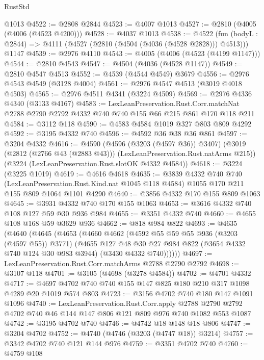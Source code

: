 \begin{lexlean}{RustStd}
\begin{coremodule}
    @1013
@4522 := @2808 @2844
@4523 := @4007 @1013
@4527 := @2810 (@4005 (@4006 (@4523 @4200)))
@4528 := @4037 @1013
@4538 := @4522
    (fun (bodyL : @2844) => @4111 (@4527 (@2810 (@4504 (@4036 (@4528 @2828))) @4513)))
    @1147
@4539 := @2976 @4110
@4543 := @4005 (@4006 (@4523 (@4199 @1147)))
@4544 := @2810 @4543
@4547 := @4504 (@4036 (@4528 @1147))
@4549 := @2810 @4547 @4513
@4552 := @4539 (@4544 @4549) @3679
@4556 := @2976 @4543 @4549 (@3128 @4004)
@4561 := @2976 @4547 @4513 (@3019 @4018 @4503)
@4565 := @2976 @4511 @4341 (@3224 @4509)
@4569 := @2976 @4336 @4340 (@3133 @4167)
@4583 := LexLeanPreservation.Rust.Corr.matchNat
    @2788
    @2790
    @2792
    @4332
    @740
    @740
    @155
    @66
    @215
    @861
    @170
    @118
    @211
@4584 := @3112 @118
@4590 := @4583 @4584 @1019 @327 @803 @809 @4292
@4592 := @3195 @4332 @740
@4596 := @4592 @36 @38 @36 @861
@4597 := @3204 @4332
@4616 := @4590
    (@4596 (@3203 (@4597 @36)) @3407)
    (@3019 (@2812 (@2766 @43 (@2883 @43))) (LexLeanPreservation.Rust.natArms @215))
    (@3224 (LexLeanPreservation.Rust.slotOK @4332 @4584))
@4618 := @3224 (@3225 @1019)
@4619 := @4616 @4618
@4635 := @3839
    @4332
    @740
    @740
    (LexLeanPreservation.Rust.Kind.nat @1045 @118 @4584)
    @1055
    @170
    @211
    @155
    @809
    @1064
    @1101
    @4290
@4640 := @3856 @4332 @170 @155 @809 @1063
@4645 := @3931 @4332 @740 @170 @155 @1063
@4653 := @3616 @4332 @740 @108 @127 @59 @30 @936 @984
@4655 := @3351 @4332 @740
@4660 := @4655 @108 @168 @59 @3629 @936
@4662 := @818 @984 @822
@4693 := @4635
    (@4640
      (@4645
        (@4653
          (@4660
            @4662
            (@4592 @55 @59 @55 @936 (@3203 (@4597 @55)) @3771)
            (@4655
              @127
              @48
              @30
              @27
              @984
              @822
              (@3654 @4332 @740 @124 @30 @983 @3944)
              (@3430 @4332 @740))))))
@4697 := LexLeanPreservation.Rust.Corr.matchArms @2788 @2790 @2792
@4698 := @3107 @118
@4701 := @3105 (@4698 (@3278 @4584))
@4702 := @4701 @4332
@4717 := @4697 @4702 @740 @740 @155 @147 @825 @180 @210 @317 @1098 @4289 @20 @1019 @574 @803
@4723 := @3156 @4702 @740 @180 @147 @1091 @1096
@4740 := LexLeanPreservation.Rust.Corr.apply
    @2788
    @2790
    @2792
    @4702
    @740
    @46
    @144
    @147
    @806
    @121
    @809
    @976
    @740
    @1082
    @553
    @1087
@4742 := @3195 @4702 @740
@4746 := @4742 @18 @148 @18 @806
@4747 := @3204 @4702
@4752 := @4740 (@4746 (@3203 (@4747 @18)) @3214)
@4757 := @3342 @4702 @740 @121 @144 @976
@4759 := @3351 @4702 @740
@4760 := @4759 @108

\end{coremodule}
\end{lexlean}
